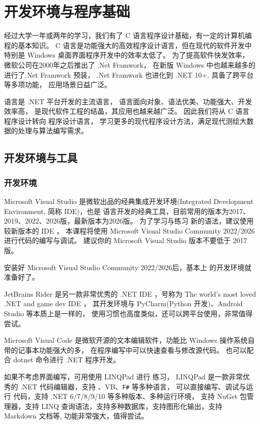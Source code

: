 
\chapter{ \cs 开发环境与程序基础}

经过大学一年或两年的学习，我们有了 C 语言程序设计基础，有一定的计算机编程的基本知识。
C 语言是功能强大的高效程序设计语言，但在现代的软件开发中特别是 Windows 桌面界面程序开发中的效率太低了。
为了提高软件快发效率， 微软公司在2000年之后推出了 .Net Framwork，
在新版 Windows 中也越来越多的进行了.Net Framwork 预装，
.Net Framwork 也进化到 .NET 10+, 具备了跨平台等多项功能， 应用场景日益广泛。


\cs 语言是 .NET 平台开发的主流语言， \cs 语言面向对象、语法优美、功能强大、开发效率高，
是现代软件工程的结晶，其应用也越来越广泛。
因此我们将从 C 语言程序设计转向 \cs 程序设计语言，
学习更多的现代程序设计方法，满足现代测绘大数据的处理与算法编写需求。


\section{ \cs  开发环境与工具}

\subsection{ \cs  开发环境}

Microsoft Visual Studio 是微软出品的经典集成开发环境(Integrated Development Environment,
简称 IDE)，也是 \cs 语言开发的经典工具，目前常用的版本为2017、2019、2022、2026版，最新版本为2026版。
为了学习与练习 \cs 新的语法，建议使用较新版本的 IDE ，
本课程将使用 Microsoft Visual Studio Community 2022/2026进行代码的编写与调试。
建议你的 Microsoft Visual Studio 版本不要低于 2017 版。


安装好 Microsoft Visual Studio Community 2022/2026后，基本上 \cs  的开发环境就准备好了。

JetBrains Rider 是另一款非常优秀的 .NET IDE ，号称为 The world's most loved .NET and game dev IDE ，
其开发环境与 PyCharm(Python 开发)、Android Studio 等本质上是一样的，
使用习惯也高度类似，还可以跨平台使用，非常值得尝试。

Microsoft Visual Code 是微软开源的文本编辑软件，功能比 Windows 操作系统自带的记事本功能强大的多，
在程序编写中可以快速查看与修改源代码。
也可以配合 dotnet 命令进行 .NET 程序开发。

如果不考虑界面编写，可用使用 LINQPad 进行 \cs 练习， LINQPad 是一款非常优秀的 .NET 代码编辑器，支持 \cs、VB、\texttt{F\#} 等多种语言，
可以直接编写、调试与运行 \cs 代码，支持 .NET 6/7/8/9/10 等多种版本、多种运行环境，
支持 NuGet 包管理器，支持 LINQ 查询语法，支持多种数据库，支持图形化输出，支持 Markdown 文档等, 功能非常强大，值得尝试。

